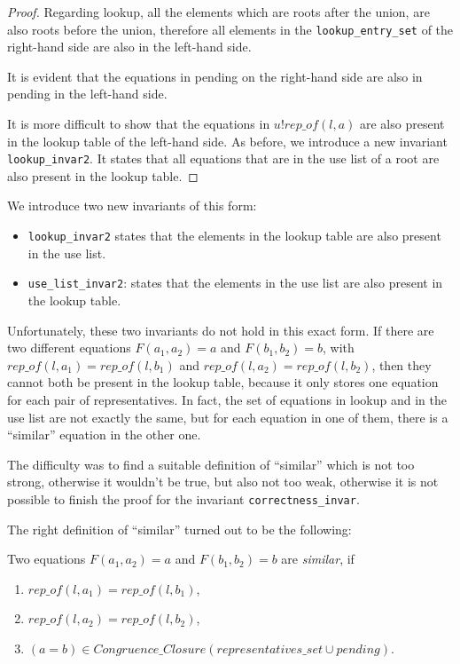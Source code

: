\begin{proof}
Regarding lookup, all the elements which are roots after the union, are also roots before the union, therefore all elements in the \lstinline{lookup_entry_set} of the right-hand side are also in the left-hand side.

It is evident that the equations in pending on the right-hand side are also in pending in the left-hand side.

It is more difficult to show that the equations in $u ! rep\_of(l, a)$ are also present in the lookup table of the left-hand side. As before, we introduce a new invariant \lstinline{lookup_invar2}. It states that all equations that are in the use list of a root are also present in the lookup table.
\end{proof}

We introduce two new invariants of this form:
\begin{itemize}
    \item \lstinline{lookup_invar2} states that the elements in the lookup table are also present in the use list.
	\item \lstinline{use_list_invar2}: states that the elements in the use list are also present in the lookup table.
\end{itemize}

Unfortunately, these two invariants do not hold in this exact form. If there are two different equations $F(a_1,a_2) = a$ and $F(b_1, b_2) = b$, with $rep\_of(l, a_1) = rep\_of(l, b_1)$ and $rep\_of(l, a_2) = rep\_of(l, b_2)$, then they cannot both be present in the lookup table, because it only stores one equation for each pair of representatives. In fact, the set of equations in lookup and in the use list are not exactly the same, but for each equation in one of them, there is a ``similar'' equation in the other one.

The difficulty was to find a suitable definition of ``similar'' which is not too strong, otherwise it wouldn't be true, but also not too weak, otherwise it is not possible to finish the proof for the invariant \lstinline{correctness_invar}.

The right definition of ``similar'' turned out to be the following:

\begin{definition}
Two equations $F(a_1, a_2) = a$ and $F(b_1, b_2) = b$ are \emph{similar}, if
\begin{enumerate}[label=(\roman*)]
\itemsep0em
    \item $rep\_of(l, a_1) = rep\_of(l, b_1)$,
    \item $rep\_of(l, a_2) = rep\_of(l, b_2)$,
    \item $(a=b) \in Congruence\_Closure (representatives\_set \cup pending)$.
\end{enumerate}
\end{definition}

